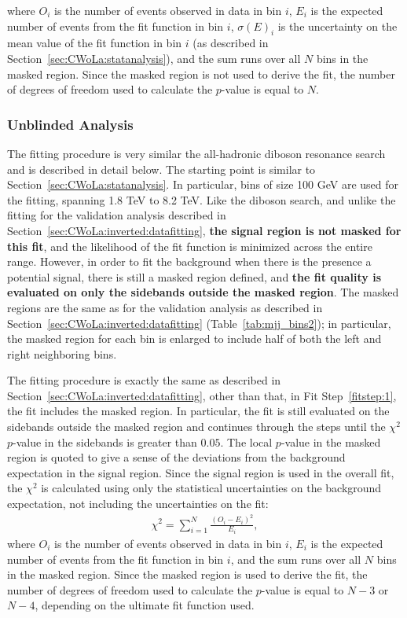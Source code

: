 \begin{enumerate}
\noindent where $O_i$ is the number of events observed in data in bin $i$, $E_i$ is the expected number of events from the fit function in bin $i$, $\sigma(E)_i$ is the uncertainty on the mean value of the fit function in bin $i$ (as described in Section~\ref{sec:CWoLa:statanalysis}), and the sum runs over all $N$ bins in the masked region.
Since the masked region is not used to derive the fit, the number of degrees of freedom used to calculate the $p$-value is equal to $N$.

\end{enumerate}

\subsubsection{Unblinded Analysis}
The fitting procedure is very similar the all-hadronic diboson resonance search and is described in detail below.
The starting point is similar to Section~\ref{sec:CWoLa:statanalysis}.
In particular, bins of size 100 GeV are used for the fitting, spanning 1.8 TeV to 8.2 TeV.
Like the diboson search, and unlike the fitting for the validation analysis described in Section~\ref{sec:CWoLa:inverted:datafitting}, \textbf{the signal region is not masked for this fit}, and the likelihood of the fit function is minimized across the entire range.
However, in order to fit the background when there is the presence a potential signal, there is still a masked region defined, and \textbf{the fit quality is evaluated on only the sidebands outside the masked region}.
The masked regions are the same as for the validation analysis as described in Section~\ref{sec:CWoLa:inverted:datafitting} (Table~\ref{tab:mjj_bins2}); in particular, the masked region for each bin is enlarged to include half of both the left and right neighboring bins.

The fitting procedure is exactly the same as described in Section~\ref{sec:CWoLa:inverted:datafitting}, other than that, in Fit Step~\ref{fitstep:1}, the fit includes the masked region.
In particular, the fit is still evaluated on the sidebands outside the masked region and continues through the steps until the $\chi^2$ $p$-value in the sidebands is greater than $0.05$.
The local $p$-value in the masked region is quoted to give a sense of the deviations from the background expectation in the signal region.
Since the signal region is used in the overall fit, the $\chi^2$ is calculated using only the statistical uncertainties on the background expectation, not including the uncertainties on the fit:
\begin{align}
  \label{eqn:CWoLa:signal_chi2}
  \chi^2=\sum_{i=1}^N \frac{(O_i-E_i)^2}{E_i},
\end{align}
\noindent where $O_i$ is the number of events observed in data in bin $i$, $E_i$ is the expected number of events from the fit function in bin $i$, and the sum runs over all $N$ bins in the masked region.
Since the masked region is used to derive the fit, the number of degrees of freedom used to calculate the $p$-value is equal to $N-3$ or $N-4$, depending on the ultimate fit function used.

